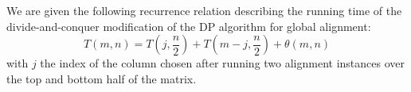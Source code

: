 
We are given the following recurrence relation describing the running time of the divide-and-conquer modification of the DP algorithm for global alignment:
\[
  T(m, n) = T(j, \frac{n}{2}) + T(m - j, \frac{n}{2}) + \theta(m, n)
\]
\noindent
with $j$ the index of the column chosen after running two alignment instances over the top and bottom half of the matrix.
